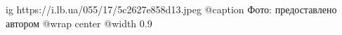  
 
 
 
 

\ifcmt
  ig https://i.lb.ua/055/17/5c2627e858d13.jpeg
	@caption Фото: предоставлено автором
  @wrap center
  @width 0.9
\fi
